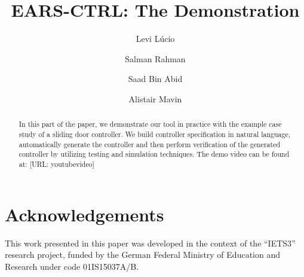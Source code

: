 \documentclass{llncs}
\begin{document}
%
\frontmatter          %

\mainmatter              %
%
\title{EARS-CTRL: The Demonstration}
%
\titlerunning{}  %
%
\author{Levi L\'ucio \and Salman Rahman
 \and Saad Bin Abid \and Alistair Mavin}
%
\authorrunning{} %
%
\tocauthor{}
%

\maketitle              %

\begin{abstract}
In this part of the paper, we demonstrate our tool in practice with the example
case study of a sliding door controller. We build controller specification in
natural language, automatically generate the controller and then perform
verification of the generated controller by utilizing testing and simulation
techniques. The demo video can be found at:
[URL: youtubevideo]
\end{abstract}

 

\newpage
\section*{Acknowledgements}
This work presented in this paper was developed in the context of the ``IETS3'' research project, funded by the German Federal Ministry of Education
and Research under code 01IS15037A/B.


\end{document}
